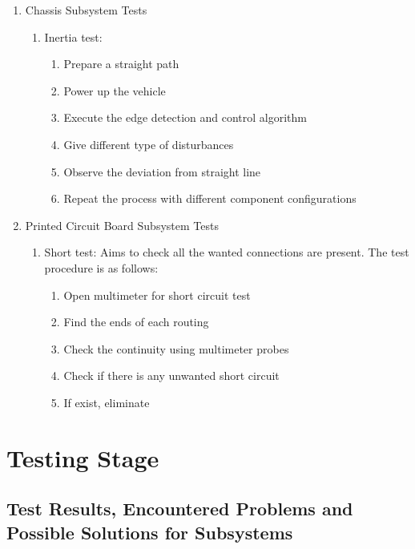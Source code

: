 \documentclass[a4paper,12pt]{article}
\begin{document}
\begin{enumerate}
	\item {Chassis Subsystem Tests}
	\begin{enumerate}
		\item Inertia test: 
		\begin{enumerate}
		\item Prepare a straight path
		\item Power up the vehicle 
		\item Execute the edge detection and control algorithm
		\item Give different type of disturbances 
		\item Observe the deviation from straight line
		\item Repeat the process with different component configurations
		\end{enumerate} 
	\end{enumerate}
	
	
	
	

	
	\item {Printed Circuit Board Subsystem Tests}
	
	\begin{enumerate}
		\item Short test: Aims to check all the wanted connections are present. The test procedure is as follows:
		\begin{enumerate} 
			\item Open multimeter for short circuit test  
			\item Find the ends of each routing 
			\item Check the continuity using multimeter probes
			\item Check if there is any unwanted short circuit
			\item If exist, eliminate
		\end{enumerate}
	\end{enumerate}
	
	
	
	\end{enumerate}
		
	
	
	\section{Testing Stage}
	
	\subsection{Test Results, Encountered Problems and Possible Solutions for Subsystems}	
	
\end{document}
